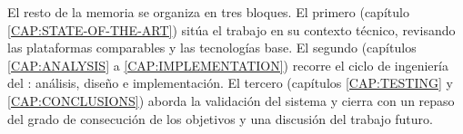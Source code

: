 El resto de la memoria se organiza en tres bloques. El primero (capítulo
\ref{CAP:STATE-OF-THE-ART}) sitúa el trabajo en su contexto técnico,
revisando las plataformas comparables y las tecnologías base. El segundo
(capítulos \ref{CAP:ANALYSIS} a \ref{CAP:IMPLEMENTATION}) recorre el ciclo
de ingeniería del : análisis, diseño e implementación. El
tercero (capítulos \ref{CAP:TESTING} y \ref{CAP:CONCLUSIONS}) aborda la
validación del sistema y cierra con un repaso del grado de consecución de
los objetivos y una discusión del trabajo futuro.
